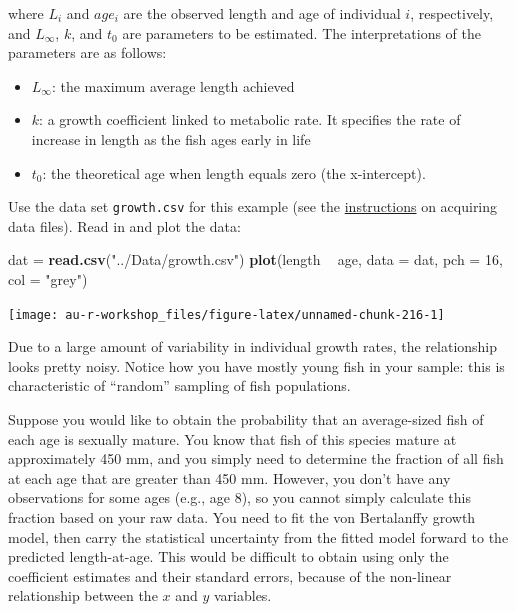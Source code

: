 \documentclass[]{book}
\newenvironment{Shaded}{\begin{snugshade}}{\end{snugshade}}
\newcommand{\DataTypeTok}[1]{\textcolor[rgb]{0.13,0.29,0.53}{#1}}
\newcommand{\DecValTok}[1]{\textcolor[rgb]{0.00,0.00,0.81}{#1}}
\newcommand{\KeywordTok}[1]{\textcolor[rgb]{0.13,0.29,0.53}{\textbf{#1}}}
\newcommand{\NormalTok}[1]{#1}
\newcommand{\OperatorTok}[1]{\textcolor[rgb]{0.81,0.36,0.00}{\textbf{#1}}}
\newcommand{\StringTok}[1]{\textcolor[rgb]{0.31,0.60,0.02}{#1}}
\providecommand{\tightlist}{%
  \setlength{\itemsep}{0pt}\setlength{\parskip}{0pt}}
\begin{document}
where \(L_i\) and \(age_i\) are the observed length and age of individual \(i\), respectively, and \(L_{\infty}\), \(k\), and \(t_0\) are parameters to be estimated. The interpretations of the parameters are as follows:

\begin{itemize}
\tightlist
\item
  \(L_{\infty}\): the maximum average length achieved
\item
  \(k\): a growth coefficient linked to metabolic rate. It specifies the rate of increase in length as the fish ages early in life
\item
  \(t_0\): the theoretical age when length equals zero (the x-intercept).
\end{itemize}

Use the data set \texttt{growth.csv} for this example (see the \protect\hyperlink{data-sets}{instructions} on acquiring data files). Read in and plot the data:

\begin{Shaded}
\begin{Highlighting}[]
\NormalTok{dat =}\StringTok{ }\KeywordTok{read.csv}\NormalTok{(}\StringTok{"../Data/growth.csv"}\NormalTok{)}
\KeywordTok{plot}\NormalTok{(length }\OperatorTok{~}\StringTok{ }\NormalTok{age, }\DataTypeTok{data =}\NormalTok{ dat, }\DataTypeTok{pch =} \DecValTok{16}\NormalTok{, }\DataTypeTok{col =} \StringTok{"grey"}\NormalTok{)}
\end{Highlighting}
\end{Shaded}

\begin{center}\texttt{[image: au-r-workshop\_files/figure-latex/unnamed-chunk-216-1]} \end{center}

Due to a large amount of variability in individual growth rates, the relationship looks pretty noisy. Notice how you have mostly young fish in your sample: this is characteristic of ``random'' sampling of fish populations.

Suppose you would like to obtain the probability that an average-sized fish of each age is sexually mature. You know that fish of this species mature at approximately 450 mm, and you simply need to determine the fraction of all fish at each age that are greater than 450 mm. However, you don't have any observations for some ages (e.g., age 8), so you cannot simply calculate this fraction based on your raw data. You need to fit the von Bertalanffy growth model, then carry the statistical uncertainty from the fitted model forward to the predicted length-at-age. This would be difficult to obtain using only the coefficient estimates and their standard errors, because of the non-linear relationship between the \(x\) and \(y\) variables.
\end{document}
